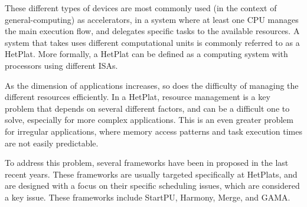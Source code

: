 \documentclass[main.tex]{subfiles}
\begin{document}
These different types of devices are most commonly used (in the context of general-computing) as accelerators, in a system where at least one \ac{CPU} manages the main execution flow, and delegates specific tasks to the available resources. A system that takes uses different computational units is commonly referred to as a \ac{HetPlat}. More formally, a \ac{HetPlat} can be defined as a computing system with processors using different \acp{ISA}.

As the dimension of applications increases, so does the difficulty of managing the different resources efficiently. In a \ac{HetPlat}, resource management is a key problem that depends on several different factors, and can be a difficult one to solve, especially for more complex applications. This is an even greater problem for irregular applications, where memory access patterns and task execution times are not easily predictable.

To address this problem, several frameworks have been in proposed in the last recent years. These frameworks are usually targeted specifically at \acp{HetPlat}, and are designed with a focus on their specific scheduling issues, which are considered a key issue. These frameworks include StartPU, Harmony, Merge, and GAMA.  
\end{document}
